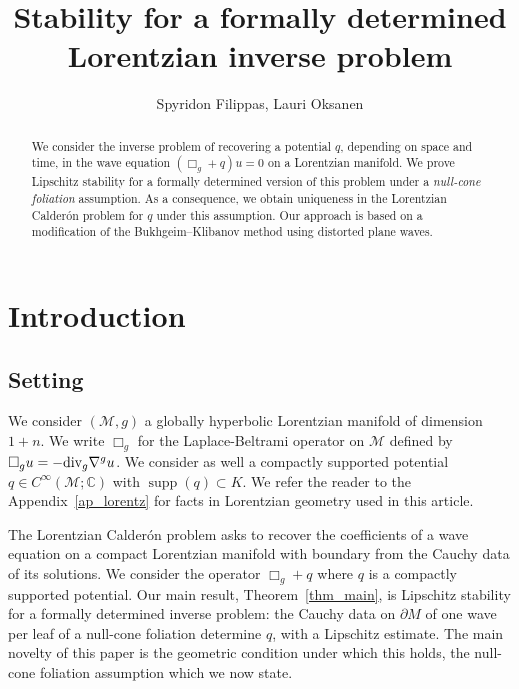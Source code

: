 \documentclass[12pt,reqno]{amsart}
\numberwithin{equation}{section}
\theoremstyle{definition}
\theoremstyle{plain}
\theoremstyle{definition}
\theoremstyle{definition}
\def\C{\mathbb C}
\newcommand{\M}{\mathcal{M}}
\newcommand{\uu}{M}
\DeclareMathOperator{\supp}{supp}
\begin{document}
\begin{abstract}
We consider the inverse problem of recovering a potential $q$, depending on space and time, in the wave equation $(\Box_g+q)u=0$ on a Lorentzian manifold. We prove Lipschitz stability for a formally determined version of this problem under a \textit{null-cone foliation} assumption. As a consequence, we obtain uniqueness in the Lorentzian Calder\'on problem for $q$ under this assumption. Our approach is based on a modification of the Bukhgeim--Klibanov method using distorted plane waves.
\end{abstract}


\title[Stability for a Lorentzian inverse problem]{Stability for a formally determined Lorentzian inverse problem}

\author[S.FILIPPAS, L. OKSANEN]{Spyridon Filippas, Lauri Oksanen}

\address{Department of Mathematics and Statistics, University of Helsinki, PO BOX 68, 00014, HELSINKI, Finland}

\address{Department of Mathematics and Statistics, University of Helsinki, PO BOX 68, 00014, HELSINKI, Finland}


\maketitle
\tableofcontents

\section{Introduction}

\subsection{Setting}\label{sec:intro_setting}

We consider $(\M,g)$ a globally hyperbolic Lorentzian manifold of dimension $1+n$. We write $\Box_{g}$ for the Laplace-Beltrami operator on $\M$ defined by $\Box_{g}u= - \textnormal{div}_{g} \nabla^{g}u$. We consider as well a compactly supported potential $q \in C^\infty (\M ; \C ) $ with $\supp(q) \subset K$. We refer the reader to the Appendix~\ref{ap_lorentz} for facts in Lorentzian geometry used in this article.

The Lorentzian Calder\'on problem asks to recover the coefficients of a wave equation on a compact Lorentzian manifold with boundary from the Cauchy data of its solutions. We consider the operator $\Box_g+q$ where $q$ is a compactly supported potential. Our main result, Theorem~\ref{thm_main}, is Lipschitz stability for a formally determined inverse problem: the Cauchy data on $\partial\uu$ of one wave per leaf of a null-cone foliation determine $q$, with a Lipschitz estimate. The main novelty of this paper is the geometric condition under which this holds, the null-cone foliation assumption which we now state. 
\end{document}
